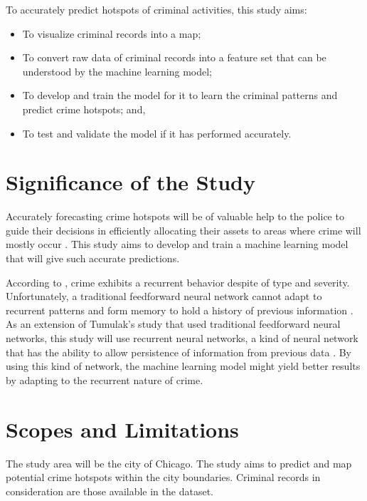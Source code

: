 To accurately predict hotspots of criminal activities, this study aims:
        \begin{itemize}
        \item To visualize criminal records into a map;
        \item To convert raw data of criminal records into a feature set that can be understood by the machine learning model;
        \item To develop and train the model for it to learn the criminal patterns and predict crime hotspots; and,
        \item To test and validate the model if it has performed accurately.
        \end{itemize}

\section{Significance of the Study} %

    Accurately forecasting crime hotspots will be of valuable help to the police to guide their decisions in efficiently allocating their assets to areas where crime will mostly occur \citep{eck2005mapping}. This study aims to develop and train a machine learning model that will give such accurate predictions.

    According to \citet{perc2013understanding}, crime exhibits a recurrent behavior despite of type and severity. Unfortunately, a traditional feedforward neural network cannot adapt to recurrent patterns and form memory to hold a history of previous information \citep{mikolov2010recurrent}. As an extension of Tumulak's study \citeyearpar{tumulak2015crime} that used traditional feedforward neural networks, this study will use recurrent neural networks, a kind of neural network that has the ability to allow persistence of information from previous data \citep{mikolov2010recurrent, guler2005recurrent}. By using this kind of network, the machine learning model might yield better results by adapting to the recurrent nature of crime.

\section{Scopes and Limitations} %

    The study area will be the city of Chicago. The study aims to predict and map potential crime hotspots within the city boundaries. Criminal records in consideration are those available in the dataset.